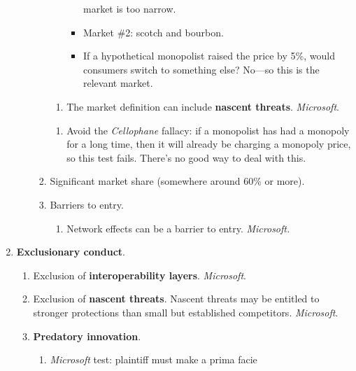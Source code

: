 \begin{enumerate}
\begin{enumerate}
\begin{enumerate}
\begin{enumerate}
\begin{itemize}
                    market is too narrow.
                    \item Market \#2: scotch and bourbon.
                    \item If a hypothetical monopolist raised the price by 5\%, 
                    would consumers switch to something else? No—so this is 
                    the relevant market. 
                \end{itemize}
            \end{enumerate}
            \begin{enumerate}
                \item The market definition can include \textbf{nascent 
                threats}. \emph{Microsoft}.
            \end{enumerate}
            \begin{enumerate}
                \item Avoid the \emph{Cellophane} fallacy: if a monopolist has 
                had a monopoly for a long time, then it will already be 
                charging a monopoly price, so this test fails. There's no good 
                way to deal with this.
            \end{enumerate}
            \item Significant market share (somewhere around 60\% or more).
            \item Barriers to entry.
            \begin{enumerate}
                \item Network effects can be a barrier to entry. 
                \emph{Microsoft.}
            \end{enumerate}
        \end{enumerate}
    \end{enumerate}
    \item \textbf{Exclusionary conduct}.
    \begin{enumerate}
        \item Exclusion of \textbf{interoperability layers}. \emph{Microsoft}.
        \item Exclusion of \textbf{nascent threats}. Nascent threats may 
        be entitled to stronger protections than small but established 
        competitors. \emph{Microsoft}.
        \item \textbf{Predatory innovation}.
        \begin{enumerate}
            \item \emph{Microsoft} test: plaintiff must make a prima facie 

\end{enumerate}
\end{enumerate}
\end{enumerate}
